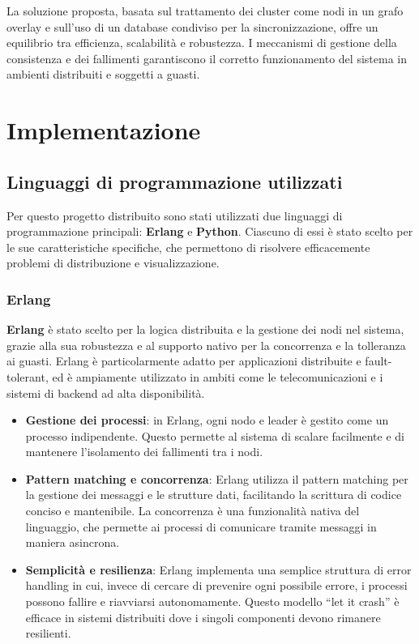 \documentclass[12pt, a4paper]{report}
\begin{document}
La soluzione proposta, basata sul trattamento dei cluster come nodi in un grafo overlay e sull'uso di un database condiviso per la sincronizzazione, offre un equilibrio tra efficienza, scalabilit\`a e robustezza. I meccanismi di gestione della consistenza e dei fallimenti garantiscono il corretto funzionamento del sistema in ambienti distribuiti e soggetti a guasti.

\newpage

\chapter{Implementazione}

\section{Linguaggi di programmazione utilizzati}

Per questo progetto distribuito sono stati utilizzati due linguaggi di programmazione principali: \textbf{Erlang} e \textbf{Python}. Ciascuno di essi \`e stato scelto per le sue caratteristiche specifiche, che permettono di risolvere efficacemente problemi di distribuzione e visualizzazione.

\subsection{Erlang}

\textbf{Erlang} \`e stato scelto per la logica distribuita e la gestione dei nodi nel sistema, grazie alla sua robustezza e al supporto nativo per la concorrenza e la tolleranza ai guasti. Erlang \`e particolarmente adatto per applicazioni distribuite e fault-tolerant, ed \`e ampiamente utilizzato in ambiti come le telecomunicazioni e i sistemi di backend ad alta disponibilità.

\begin{itemize}
    \item \textbf{Gestione dei processi}: in Erlang, ogni nodo e leader \`e gestito come un processo indipendente. Questo permette al sistema di scalare facilmente e di mantenere l'isolamento dei fallimenti tra i nodi.
    \item \textbf{Pattern matching e concorrenza}: Erlang utilizza il pattern matching per la gestione dei messaggi e le strutture dati, facilitando la scrittura di codice conciso e mantenibile. La concorrenza \`e una funzionalità nativa del linguaggio, che permette ai processi di comunicare tramite messaggi in maniera asincrona.
    \item \textbf{Semplicità e resilienza}: Erlang implementa una semplice struttura di error handling in cui, invece di cercare di prevenire ogni possibile errore, i processi possono fallire e riavviarsi autonomamente. Questo modello “let it crash” \`e efficace in sistemi distribuiti dove i singoli componenti devono rimanere resilienti.
\end{itemize}
\end{document}
